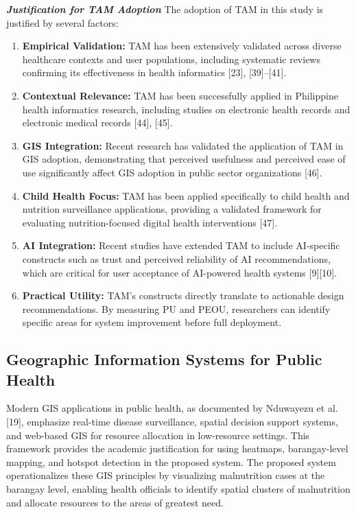 \documentclass[12pt, a4paper]{report}
\begin{document}
\noindent \textbf{\textit{Justification for TAM Adoption}}
The adoption of TAM in this study is justified by several factors:
\begin{enumerate}
    \item \textbf{Empirical Validation:} TAM has been extensively validated across diverse healthcare contexts and user populations, including systematic reviews confirming its effectiveness in health informatics [23], [39]--[41].
    \item \textbf{Contextual Relevance:} TAM has been successfully applied in Philippine health informatics research, including studies on electronic health records and electronic medical records [44], [45].
    \item \textbf{GIS Integration:} Recent research has validated the application of TAM in GIS adoption, demonstrating that perceived usefulness and perceived ease of use significantly affect GIS adoption in public sector organizations [46].
    \item \textbf{Child Health Focus:} TAM has been applied specifically to child health and nutrition surveillance applications, providing a validated framework for evaluating nutrition-focused digital health interventions [47].
    \item \textbf{AI Integration:} Recent studies have extended TAM to include AI-specific constructs such as trust and perceived reliability of AI recommendations, which are critical for user acceptance of AI-powered health systems [9][10].
    \item \textbf{Practical Utility:} TAM's constructs directly translate to actionable design recommendations. By measuring PU and PEOU, researchers can identify specific areas for system improvement before full deployment.
\end{enumerate}

\subsection{Geographic Information Systems for Public Health}
Modern GIS applications in public health, as documented by Nduwayezu et al. [19], emphasize real-time disease surveillance, spatial decision support systems, and web-based GIS for resource allocation in low-resource settings. This framework provides the academic justification for using heatmaps, barangay-level mapping, and hotspot detection in the proposed system.
The proposed system operationalizes these GIS principles by visualizing malnutrition cases at the barangay level, enabling health officials to identify spatial clusters of malnutrition and allocate resources to the areas of greatest need.
\end{document}
